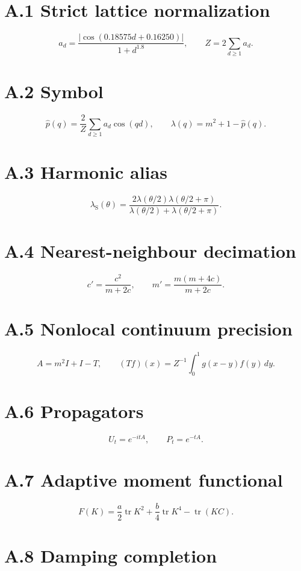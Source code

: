 \documentclass[11pt,a4paper,openany]{report}
\begin{document}
\section{A.1 Strict lattice normalization}

\[
a_d
=
\frac{|\cos(0.18575d+0.16250)|}{1+d^{1.8}},
\qquad
Z=2\sum_{d\ge1}a_d.
\]

\section{A.2 Symbol}

\[
\widehat p(q)
=
\frac2Z\sum_{d\ge1}a_d\cos(qd),
\qquad
\lambda(q)=m^2+1-\widehat p(q).
\]

\section{A.3 Harmonic alias}

\[
\lambda_{\mathrm S}(\theta)
=
\frac{
2\lambda(\theta/2)\lambda(\theta/2+\pi)
}{
\lambda(\theta/2)+\lambda(\theta/2+\pi)
}.
\]

\section{A.4 Nearest-neighbour decimation}

\[
c'=\frac{c^2}{m+2c},
\qquad
m'=\frac{m(m+4c)}{m+2c}.
\]

\section{A.5 Nonlocal continuum precision}

\[
A=m^2I+I-T,
\qquad
(Tf)(x)
=
Z^{-1}\int_0^1g(x-y)f(y)\,dy.
\]

\section{A.6 Propagators}

\[
U_t=e^{-itA},
\qquad
P_t=e^{-tA}.
\]

\section{A.7 Adaptive moment functional}

\[
F(K)
=
\frac a2\operatorname{tr}K^2
+\frac b4\operatorname{tr}K^4
-\operatorname{tr}(KC).
\]

\section{A.8 Damping completion}
\end{document}
